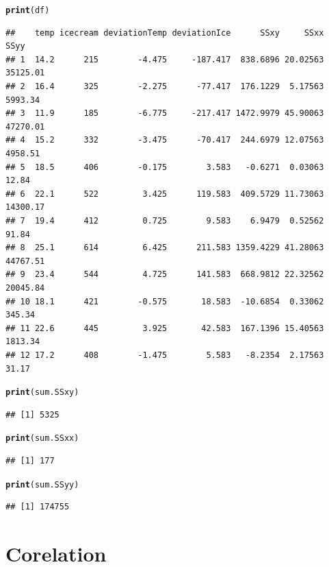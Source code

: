 \documentclass[slidestop,compress,14pt,xcolor=dvipsnames]{beamer}\usepackage[]{graphicx}\usepackage[]{color}
\makeatletter
\newcommand{\hlstd}[1]{\textcolor[rgb]{0.345,0.345,0.345}{#1}}%
\newcommand{\hlkwd}[1]{\textcolor[rgb]{0.737,0.353,0.396}{\textbf{#1}}}%
\newenvironment{kframe}{%
 \def\at@end@of@kframe{}%
 \ifinner\ifhmode%
  \def\at@end@of@kframe{\end{minipage}}%
  \begin{minipage}{\columnwidth}%
 \fi\fi%
 \def\FrameCommand##1{\hskip\@totalleftmargin \hskip-\fboxsep
 \colorbox{shadecolor}{##1}\hskip-\fboxsep
     \hskip-\linewidth \hskip-\@totalleftmargin \hskip\columnwidth}%
 \MakeFramed {\advance\hsize-\width
   \@totalleftmargin\z@ \linewidth\hsize
   \@setminipage}}%
 {\par\unskip\endMakeFramed%
 \at@end@of@kframe}
\newenvironment{knitrout}{}{} %
\makeatother
\begin{document}
\begin{knitrout}
\color{fgcolor}\begin{kframe}
\begin{alltt}
\hlkwd{print}\hlstd{(df)}
\end{alltt}
\begin{verbatim}
##    temp icecream deviationTemp deviationIce      SSxy     SSxx     SSyy
## 1  14.2      215        -4.475     -187.417  838.6896 20.02563 35125.01
## 2  16.4      325        -2.275      -77.417  176.1229  5.17563  5993.34
## 3  11.9      185        -6.775     -217.417 1472.9979 45.90063 47270.01
## 4  15.2      332        -3.475      -70.417  244.6979 12.07563  4958.51
## 5  18.5      406        -0.175        3.583   -0.6271  0.03063    12.84
## 6  22.1      522         3.425      119.583  409.5729 11.73063 14300.17
## 7  19.4      412         0.725        9.583    6.9479  0.52562    91.84
## 8  25.1      614         6.425      211.583 1359.4229 41.28063 44767.51
## 9  23.4      544         4.725      141.583  668.9812 22.32562 20045.84
## 10 18.1      421        -0.575       18.583  -10.6854  0.33062   345.34
## 11 22.6      445         3.925       42.583  167.1396 15.40563  1813.34
## 12 17.2      408        -1.475        5.583   -8.2354  2.17563    31.17
\end{verbatim}
\begin{alltt}
\hlkwd{print}\hlstd{(sum.SSxy)}
\end{alltt}
\begin{verbatim}
## [1] 5325
\end{verbatim}
\begin{alltt}
\hlkwd{print}\hlstd{(sum.SSxx)}
\end{alltt}
\begin{verbatim}
## [1] 177
\end{verbatim}
\begin{alltt}
\hlkwd{print}\hlstd{(sum.SSyy)}
\end{alltt}
\begin{verbatim}
## [1] 174755
\end{verbatim}
\end{kframe}
\end{knitrout}




\section{Corelation}
\end{document}
